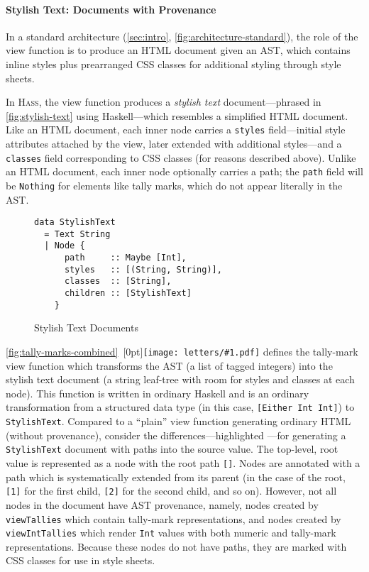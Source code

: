 \documentclass[acmsmall, screen]{acmart}
\newcommand{\parahead}[1]
  {\paragraph{\textbf{#1}}}
\newcommand{\hass}
{\textsc{Hass}}
\newcommand{\figBubble}[1]{\raisebox{-0.03in}[0pt]{\texttt{[image: letters/\#1.pdf]}}}
\newcommand{\refBubble}[1]
  {~\figBubble{#1}}
\begin{document}
\parahead{Stylish Text: Documents with Provenance}






In a standard architecture (\autoref{sec:intro}, \autoref{fig:architecture-standard}), the role of the view function is to produce an HTML document given an AST, which contains inline styles plus prearranged CSS classes for additional styling through style sheets.

In \hass{}, the view function produces a \emph{stylish text} document---phrased in \autoref{fig:stylish-text} using Haskell---which resembles a simplified HTML document.
Like an HTML document, each inner node carries a \verb+styles+ field---initial style attributes attached by the view, later extended with additional styles---and a \verb+classes+ field corresponding to CSS classes (for reasons described above).
Unlike an HTML document, each inner node optionally carries a path; the \texttt{path} field will be \texttt{Nothing} for elements like tally marks, which do not appear literally in the AST.



\begin{wrapfigure}[11]{r}{0.43\textwidth}
\vspace{-0.07in} \small
\begin{Verbatim}
data StylishText
  = Text String
  | Node {
      path     :: Maybe [Int],
      styles   :: [(String, String)],
      classes  :: [String],
      children :: [StylishText]
    }
\end{Verbatim}
\caption{Stylish Text Documents}
\label{fig:stylish-text}
\end{wrapfigure}
 \autoref{fig:tally-marks-combined}\refBubble{b} defines the tally-mark view function which transforms the AST (a list of tagged integers) into the stylish text document (a string leaf-tree with room for styles and classes at each node).
This function is written in ordinary Haskell and is an ordinary transformation from a structured data type (in this case, \texttt{[Either Int Int]}) to \texttt{StylishText}. Compared to a ``plain'' view function generating ordinary HTML (without provenance), consider the differences---highlighted ---for generating a \texttt{StylishText} document with paths into the source value.
The top-level, root value is represented as a node with the root path \texttt{[]}.
Nodes are annotated with a path which is systematically extended from its parent (in the case of the root, \texttt{[1]} for the first child, \texttt{[2]} for the second child, and so on).
However, not all nodes in the document have AST provenance, namely, nodes created by \texttt{viewTallies} which contain tally-mark representations, and
nodes created by \texttt{viewIntTallies} which render \texttt{Int} values with both numeric and tally-mark representations.
Because these nodes do not have paths, they are marked with CSS classes for use in style sheets.
\end{document}
